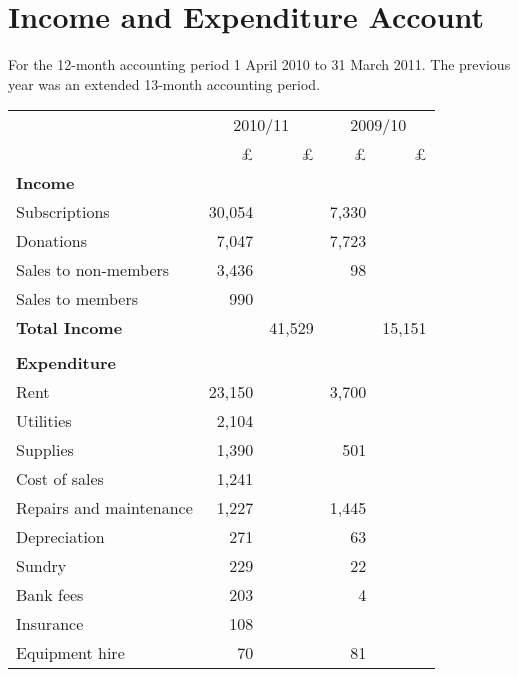 \section{Income and Expenditure Account}
For the 12-month accounting period 1 April 2010 to 31 March 2011.
The previous year was an extended 13-month accounting period.

\begin{center}
\begin{tabular}{ l  r  r r r }
\toprule
            & \multicolumn{2}{c}{2010/11}  & \multicolumn{2}{c}{2009/10} \\
\cmidrule(r){2-3} \cmidrule(r){4-5}
                            & £      & £      & £     & £     \\
{\bf Income}                &        &        &       &       \\
Subscriptions               & 30,054 &        & 7,330 &       \\
Donations                   & 7,047  &        & 7,723 &       \\
Sales to non-members        & 3,436  &        & 98    &       \\
Sales to members            & 990    &        &       &       \\
{\bf Total Income}          &        & 41,529 &       & 15,151 \\
\cmidrule(r){2-3} \cmidrule(r){4-5} \\
{\bf Expenditure}           &        &        &       &         \\
Rent                        & 23,150 &        & 3,700 &         \\
Utilities                   & 2,104  &        &       &   \\
Supplies                    & 1,390  &        & 501   &   \\
Cost of sales               & 1,241  &        &       &   \\
Repairs and maintenance     & 1,227  &        & 1,445 &         \\
Depreciation                & 271    &        & 63    &   \\
Sundry                      & 229    &        & 22    &   \\
Bank fees                   & 203    &        & 4     &   \\
Insurance                   & 108    &        &       &   \\
Equipment hire              & 70     &        & 81    &   \\

\end{tabular}
\end{center}
